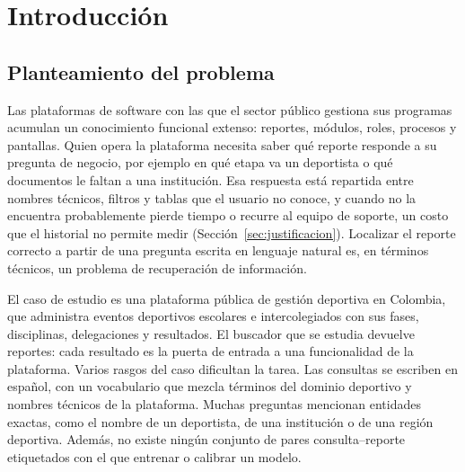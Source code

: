 \documentclass[11pt,letterpaper]{article}
\numberwithin{equation}{section}
\begin{document}
\clearpage

\section{Introducción}
\label{sec:intro}

\subsection{Planteamiento del problema}
\label{sec:problema}
Las plataformas de software con las que el sector público gestiona sus programas acumulan un conocimiento funcional extenso: reportes, módulos, roles, procesos y pantallas. Quien opera la plataforma necesita saber qué reporte responde a su pregunta de negocio, por ejemplo en qué etapa va un deportista o qué documentos le faltan a una institución. Esa respuesta está repartida entre nombres técnicos, filtros y tablas que el usuario no conoce, y cuando no la encuentra probablemente pierde tiempo o recurre al equipo de soporte, un costo que el historial no permite medir (Sección~\ref{sec:justificacion}). Localizar el reporte correcto a partir de una pregunta escrita en lenguaje natural es, en términos técnicos, un problema de recuperación de información.

El caso de estudio es una plataforma pública de gestión deportiva en Colombia, que administra eventos deportivos escolares e intercolegiados con sus fases, disciplinas, delegaciones y resultados. El buscador que se estudia devuelve reportes: cada resultado es la puerta de entrada a una funcionalidad de la plataforma. Varios rasgos del caso dificultan la tarea. Las consultas se escriben en español, con un vocabulario que mezcla términos del dominio deportivo y nombres técnicos de la plataforma. Muchas preguntas mencionan entidades exactas, como el nombre de un deportista, de una institución o de una región deportiva. Además, no existe ningún conjunto de pares consulta--reporte etiquetados con el que entrenar o calibrar un modelo.
\end{document}

